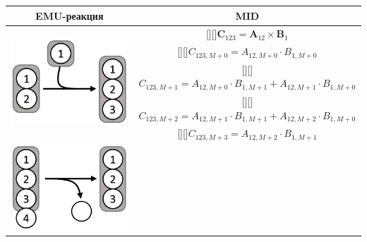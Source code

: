 \documentclass[14pt, a4paper]{extreport}
\newcommand{\adj}[1]{\raisebox{-2pt}[\height][\depth]{#1}}
\begin{document}
\begin{table}
	\begin{center}
		\begin{tabular}{c | c}
			\hline
			EMU-реакция & MID\\
			\hline
			\multirow{5}{*}[-1mm]{
				\begin{minipage}{0.3\linewidth}
					\centering{Реакция конденсации}
					\includegraphics[scale=0.85]{EMU_reaction_1.png}
				\end{minipage}
			} 
			  & \adj{$\mathbf{C}_{123} = \mathbf{A}_{12} \times \mathbf{B}_1$}\\[0.5ex]
			  & \adj{$C_{123,M+0} = A_{12,M+0} \cdot B_{1,M+0}$}\\ [0.5ex]
			  & \adj{$C_{123,M+1} = A_{12,M+0} \cdot B_{1,M+1} + A_{12,M+1} \cdot B_{1,M+0}$}\\ [0.5ex]
			  & \adj{$C_{123,M+2} = A_{12,M+1} \cdot B_{1,M+1} + A_{12,M+2} \cdot B_{1,M+0}$}\\ [0.5ex]
			  & \adj{$C_{123,M+3} = A_{12,M+2} \cdot B_{1,M+1}$} \\ [0.5ex]
			 \hline 
			 \multirow{5}{*}[-1mm]{
			 	\begin{minipage}{0.3\linewidth}
			 		\centering{Реакция расщепления}
			 		\includegraphics[scale=0.85]{EMU_reaction_2.png}

\end{minipage}}
\end{tabular}
\end{center}
\end{table}
\end{document}
